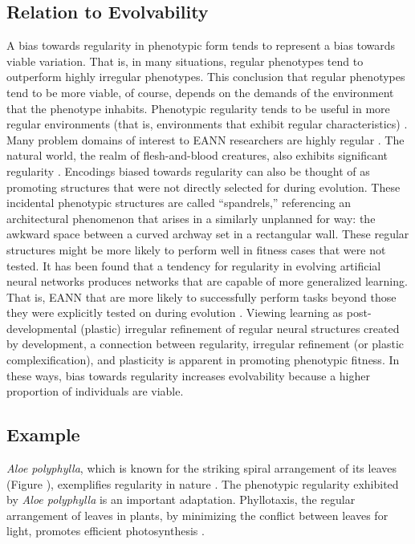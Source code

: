 \subsection{Relation to Evolvability}
A bias towards regularity in phenotypic form tends to represent a bias towards viable variation. That is, in many situations, regular phenotypes tend to outperform highly irregular phenotypes. This conclusion that regular phenotypes tend to be more viable, of course, depends on the demands of the environment that the phenotype inhabits. Phenotypic regularity tends to be useful in more regular environments (that is, environments that exhibit regular characteristics) \cite{Clune2011OnRegularity}. Many problem domains of interest to EANN researchers are highly regular \cite{Clune2011OnRegularity}. The natural world, the realm of flesh-and-blood creatures, also exhibits significant regularity \cite[pg 161]{Downing2015IntelligenceSystems}. Encodings biased towards regularity can also be thought of as promoting structures that were not directly selected for during evolution. These incidental phenotypic structures are called ``spandrels,'' referencing an architectural phenomenon that arises in a similarly unplanned for way: the awkward space between a curved archway set in a rectangular wall. These regular structures might be more likely to perform well in fitness cases that were not tested. It has been found that a tendency for regularity in evolving artificial neural networks produces networks that are capable of more generalized learning. That is, EANN that are more likely to successfully perform tasks beyond those they were explicitly tested on during evolution \cite{Tonelli2013OnNetworks}. Viewing learning as post-developmental (plastic) irregular refinement of regular neural structures created by development, a connection between regularity, irregular refinement (or plastic complexification), and plasticity is apparent in promoting phenotypic fitness.  In these ways, bias towards regularity increases evolvability because a higher proportion of individuals are viable.

\subsection{Example}
\textit{Aloe polyphylla}, which is known for the striking spiral arrangement of its leaves (Figure ), exemplifies regularity in nature \cite{RoyalHorticulturalSocietyAloePolyphylla}. The phenotypic regularity exhibited by \textit{Aloe polyphylla} is an important adaptation. Phyllotaxis, the regular arrangement of leaves in plants, by minimizing the conflict between leaves for light, promotes efficient photosynthesis \cite{Kappraff2004GrowthNumber}.

